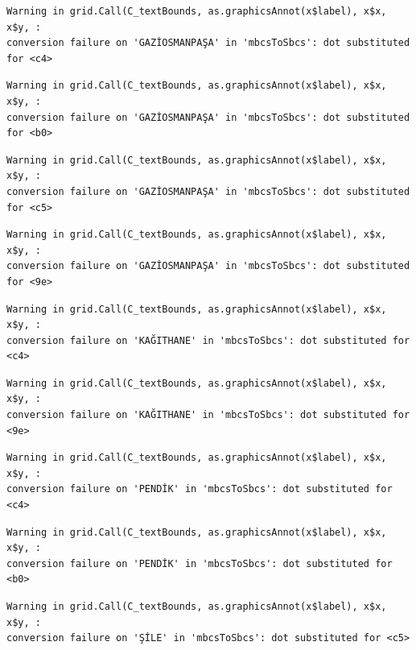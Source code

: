\documentclass[
  11pt,
  a4paper,
  DIV=11,
  numbers=noendperiod]{scrartcl}
\begin{document}
\begin{verbatim}
Warning in grid.Call(C_textBounds, as.graphicsAnnot(x$label), x$x, x$y, :
conversion failure on 'GAZİOSMANPAŞA' in 'mbcsToSbcs': dot substituted for <c4>
\end{verbatim}

\begin{verbatim}
Warning in grid.Call(C_textBounds, as.graphicsAnnot(x$label), x$x, x$y, :
conversion failure on 'GAZİOSMANPAŞA' in 'mbcsToSbcs': dot substituted for <b0>
\end{verbatim}

\begin{verbatim}
Warning in grid.Call(C_textBounds, as.graphicsAnnot(x$label), x$x, x$y, :
conversion failure on 'GAZİOSMANPAŞA' in 'mbcsToSbcs': dot substituted for <c5>
\end{verbatim}

\begin{verbatim}
Warning in grid.Call(C_textBounds, as.graphicsAnnot(x$label), x$x, x$y, :
conversion failure on 'GAZİOSMANPAŞA' in 'mbcsToSbcs': dot substituted for <9e>
\end{verbatim}

\begin{verbatim}
Warning in grid.Call(C_textBounds, as.graphicsAnnot(x$label), x$x, x$y, :
conversion failure on 'KAĞITHANE' in 'mbcsToSbcs': dot substituted for <c4>
\end{verbatim}

\begin{verbatim}
Warning in grid.Call(C_textBounds, as.graphicsAnnot(x$label), x$x, x$y, :
conversion failure on 'KAĞITHANE' in 'mbcsToSbcs': dot substituted for <9e>
\end{verbatim}

\begin{verbatim}
Warning in grid.Call(C_textBounds, as.graphicsAnnot(x$label), x$x, x$y, :
conversion failure on 'PENDİK' in 'mbcsToSbcs': dot substituted for <c4>
\end{verbatim}

\begin{verbatim}
Warning in grid.Call(C_textBounds, as.graphicsAnnot(x$label), x$x, x$y, :
conversion failure on 'PENDİK' in 'mbcsToSbcs': dot substituted for <b0>
\end{verbatim}

\begin{verbatim}
Warning in grid.Call(C_textBounds, as.graphicsAnnot(x$label), x$x, x$y, :
conversion failure on 'ŞİLE' in 'mbcsToSbcs': dot substituted for <c5>
\end{verbatim}
\end{document}
